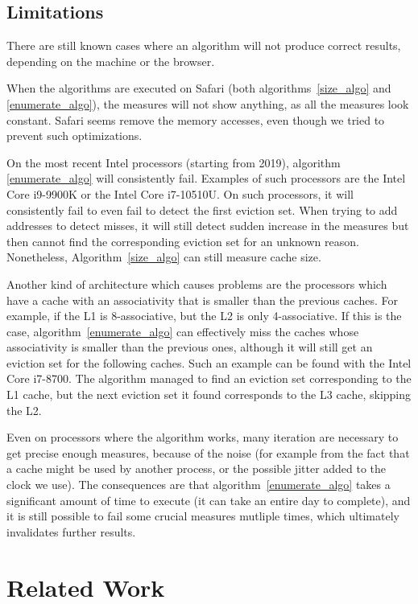 \documentclass[a4paper,11pt,oneside]{report}
\begin{document}
\section{Limitations}

There are still known cases where an algorithm will not produce correct results, depending on the machine or the browser.

When the algorithms are executed on Safari (both algorithms~\ref{size_algo} and \ref{enumerate_algo}), the measures will not show anything, as all the measures look constant. Safari seems remove the memory accesses, even though we tried to prevent such optimizations.

On the most recent Intel processors (starting from 2019), algorithm \ref{enumerate_algo} will consistently fail. Examples of such processors are the Intel Core i9-9900K or the Intel Core i7-10510U. On such processors, it will consistently fail to even fail to detect the first eviction set. When trying to add addresses to detect misses, it will still detect sudden increase in the measures but then cannot find the corresponding eviction set for an unknown reason. Nonetheless, Algorithm~\ref{size_algo} can still measure cache size.

Another kind of architecture which causes problems are the processors which have a cache with an associativity that is smaller than the previous caches. For example, if the L1 is 8-associative, but the L2 is only 4-associative. If this is the case, algorithm~\ref{enumerate_algo} can effectively miss the caches whose associativity is smaller than the previous ones, although it will still get an eviction set for the following caches. Such an example can be found with the Intel Core i7-8700. The algorithm managed to find an eviction set corresponding to the L1 cache, but the next eviction set it found corresponds to the L3 cache, skipping the L2.

Even on processors where the algorithm works, many iteration are necessary to get precise enough measures, because of the noise (for example from the fact that a cache might be used by another process, or the possible jitter added to the clock we use). The consequences are that algorithm~\ref{enumerate_algo} takes a significant amount of time to execute (it can take an entire day to complete), and it is still possible to fail some crucial measures mutliple times, which ultimately invalidates further results.


\chapter{Related Work}
\end{document}
